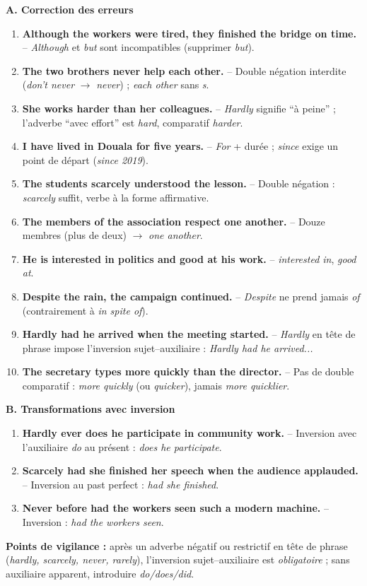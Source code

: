 \documentclass[11pt]{article}
\begin{document}
\begin{corrige}
\textbf{A. Correction des erreurs}
\begin{enumerate}
\item \textbf{Although the workers were tired, they finished the bridge on time.} -- \emph{Although} et \emph{but} sont incompatibles (supprimer \emph{but}).
\item \textbf{The two brothers never help each other.} -- Double négation interdite (\emph{don't never} $\rightarrow$ \emph{never}) ; \emph{each other} sans \emph{s}.
\item \textbf{She works harder than her colleagues.} -- \emph{Hardly} signifie ``à peine'' ; l'adverbe ``avec effort'' est \emph{hard}, comparatif \emph{harder}.
\item \textbf{I have lived in Douala for five years.} -- \emph{For} + durée ; \emph{since} exige un point de départ (\emph{since 2019}).
\item \textbf{The students scarcely understood the lesson.} -- Double négation : \emph{scarcely} suffit, verbe à la forme affirmative.
\item \textbf{The members of the association respect one another.} -- Douze membres (plus de deux) $\rightarrow$ \emph{one another}.
\item \textbf{He is interested in politics and good at his work.} -- \emph{interested in}, \emph{good at}.
\item \textbf{Despite the rain, the campaign continued.} -- \emph{Despite} ne prend jamais \emph{of} (contrairement à \emph{in spite of}).
\item \textbf{Hardly had he arrived when the meeting started.} -- \emph{Hardly} en tête de phrase impose l'inversion sujet--auxiliaire : \emph{Hardly had he arrived...}
\item \textbf{The secretary types more quickly than the director.} -- Pas de double comparatif : \emph{more quickly} (ou \emph{quicker}), jamais \emph{more quicklier}.
\end{enumerate}
\textbf{B. Transformations avec inversion}
\begin{enumerate}
\item \textbf{Hardly ever does he participate in community work.} -- Inversion avec l'auxiliaire \emph{do} au présent : \emph{does he participate}.
\item \textbf{Scarcely had she finished her speech when the audience applauded.} -- Inversion au past perfect : \emph{had she finished}.
\item \textbf{Never before had the workers seen such a modern machine.} -- Inversion : \emph{had the workers seen}.
\end{enumerate}
\textbf{Points de vigilance :} après un adverbe négatif ou restrictif en tête de phrase (\emph{hardly, scarcely, never, rarely}), l'inversion sujet--auxiliaire est \emph{obligatoire} ; sans auxiliaire apparent, introduire \emph{do/does/did}.
\end{corrige}
\end{document}
